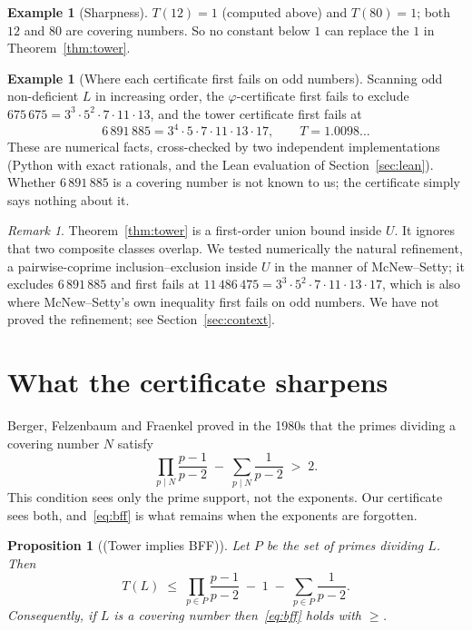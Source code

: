 \documentclass[11pt]{article}
\newtheorem{proposition}[theorem]{Proposition}
\theoremstyle{definition}
\newtheorem{example}[theorem]{Example}
\theoremstyle{remark}
\newtheorem{remark}[theorem]{Remark}
\newcommand{\moniker}[1]{\textup{(#1)}}
\begin{document}
\begin{example}[Sharpness]
$T(12) = 1$ (computed above) and $T(80) = 1$; both $12$ and $80$ are covering numbers. So no constant below $1$ can replace the $1$ in Theorem~\ref{thm:tower}.
\end{example}

\begin{example}[Where each certificate first fails on odd numbers]
Scanning odd non-deficient $L$ in increasing order, the $\varphi$-certificate first fails to exclude $675\,675 = 3^3\cdot 5^2\cdot 7\cdot 11\cdot 13$, and the tower certificate first fails at
\[
6\,891\,885 = 3^4 \cdot 5 \cdot 7 \cdot 11 \cdot 13 \cdot 17, \qquad T = 1.0098\ldots
\]
These are numerical facts, cross-checked by two independent implementations (Python with exact rationals, and the Lean evaluation of Section~\ref{sec:lean}). Whether $6\,891\,885$ is a covering number is not known to us; the certificate simply says nothing about it.
\end{example}

\begin{remark}
Theorem~\ref{thm:tower} is a first-order union bound inside $U$. It ignores that two composite classes overlap. We tested numerically the natural refinement, a pairwise-coprime inclusion--exclusion inside $U$ in the manner of McNew--Setty; it excludes $6\,891\,885$ and first fails at $11\,486\,475 = 3^3\cdot 5^2\cdot 7\cdot 11\cdot 13\cdot 17$, which is also where McNew--Setty's own inequality first fails on odd numbers. We have not proved the refinement; see Section~\ref{sec:context}.
\end{remark}

\section{What the certificate sharpens}\label{sec:bff}

Berger, Felzenbaum and Fraenkel proved in the 1980s that the primes dividing a covering number $N$ satisfy
\begin{equation}\label{eq:bff}
\prod_{p \mid N} \frac{p-1}{p-2} \;-\; \sum_{p \mid N} \frac{1}{p-2} \;>\; 2 .
\end{equation}
This condition sees only the prime support, not the exponents. Our certificate sees both, and~\eqref{eq:bff} is what remains when the exponents are forgotten.

\begin{proposition}[\moniker{Tower implies BFF}]\label{prop:bff}
Let $P$ be the set of primes dividing $L$. Then
\[
T(L) \;\le\; \prod_{p \in P} \frac{p-1}{p-2} \;-\; 1 \;-\; \sum_{p \in P} \frac{1}{p-2}.
\]
Consequently, if $L$ is a covering number then~\eqref{eq:bff} holds with $\ge$.
\end{proposition}
\end{document}
